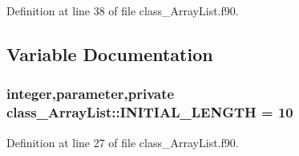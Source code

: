 Definition at line 38 of file class\_\-ArrayList.f90.



\subsection{Variable Documentation}
\hypertarget{namespaceclass__ArrayList_a710a353a125e9fcbc6bbb0fc3a468afb}{
\subsubsection[{INITIAL\_\-LENGTH}]{\setlength{\rightskip}{0pt plus 5cm}integer,parameter,private {\bf class\_\-ArrayList::INITIAL\_\-LENGTH} = 10}}
\label{namespaceclass__ArrayList_a710a353a125e9fcbc6bbb0fc3a468afb}


Definition at line 27 of file class\_\-ArrayList.f90.

